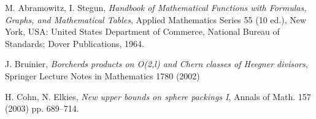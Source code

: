   \begin{thebibliography}{10}
   {\sc M. Abramowitz, I. Stegun}, \emph{ Handbook of Mathematical Functions with Formulas, Graphs, and Mathematical Tables}, Applied Mathematics Series 55 (10 ed.), New York, USA: United States Department of Commerce, National Bureau of Standards; Dover Publications, 1964.


   {\sc J. Bruinier}, \emph{Borcherds products on O(2,l) and Chern classes of Heegner divisors}, Springer Lecture Notes in Mathematics 1780 (2002)

    {\sc H. Cohn, N. Elkies}, \emph{New upper bounds on sphere packings I}, Annals of Math. 157 (2003) pp. 689--714.












\end{thebibliography}

